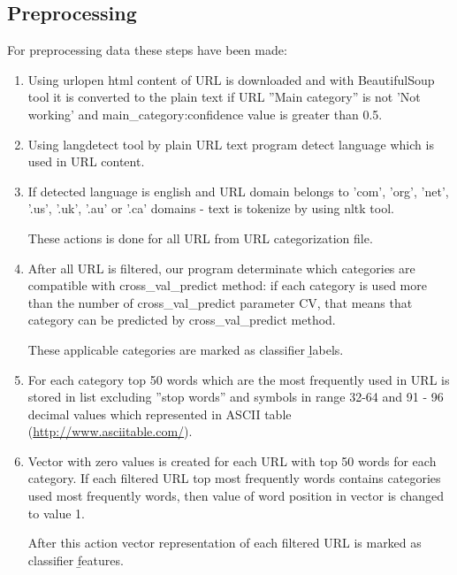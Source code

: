 \documentclass{article} %
\begin{document}
\subsection{Preprocessing}

 For preprocessing data these steps have been made:
 
 \begin{enumerate}
 	
	 	\item Using urlopen \cite{url_open} html content of URL is downloaded and with BeautifulSoup tool it is converted to the plain text if URL ''Main category'' is not 'Not working' and main\_category:confidence value is greater than 0.5.
 	\item Using langdetect tool by plain URL text program detect language which is used in URL content.
 	\item If detected language is english and URL domain belongs to 'com', 'org', 'net', '.us', '.uk', '.au' or '.ca' domains - text is tokenize by using nltk tool. 
 	
 	These actions is done for all URL from URL categorization file.
 	
 	\item After all URL is filtered, our program determinate which categories are compatible with cross\_val\_predict method: if each category is used more than the number of cross\_val\_predict parameter CV, that means that category can be predicted by cross\_val\_predict method.
 	
 	These applicable categories are marked as classifier \b{labels}.
 	
 	\item For each category top 50 words which are the most frequently used in URL is stored in list excluding ''stop words'' and symbols in range 32-64 and 91 - 96 decimal values which represented in ASCII table (\href{http://www.asciitable.com/}{http://www.asciitable.com/}).
 	
 	\item Vector with zero values is created for each URL with top 50 words for each category. If each filtered URL top most frequently words contains categories used most frequently words, then value of word position in vector is changed to value 1.
 	
 	After this action vector representation of each filtered URL is marked as classifier \b{features}.
 	
 \end{enumerate} 
	
\end{document}
